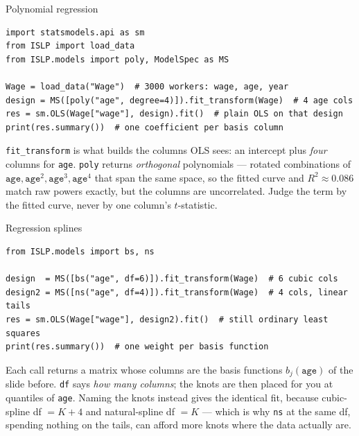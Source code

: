 \documentclass[aspectratio=169,11pt]{beamer}
\begin{document}

\begin{frame}[fragile]{Polynomial regression}
  \begin{lstlisting}
import statsmodels.api as sm
from ISLP import load_data
from ISLP.models import poly, ModelSpec as MS

Wage = load_data("Wage")  # 3000 workers: wage, age, year
design = MS([poly("age", degree=4)]).fit_transform(Wage)  # 4 age cols
res = sm.OLS(Wage["wage"], design).fit()  # plain OLS on that design
print(res.summary())  # one coefficient per basis column
  \end{lstlisting}
  \begin{readme}
    \texttt{fit\_transform} is what builds the columns OLS sees: an
    intercept plus \emph{four} columns for \texttt{age}. \texttt{poly}
    returns \emph{orthogonal} polynomials --- rotated combinations of
    $\texttt{age},\texttt{age}^2,\texttt{age}^3,\texttt{age}^4$ that span
    the same space, so the fitted curve and $R^2\approx0.086$ match raw
    powers exactly, but the columns are uncorrelated. Judge the term by
    the fitted curve, never by one column's $t$-statistic.
  \end{readme}
\end{frame}

\begin{frame}[fragile]{Regression splines}
  \begin{lstlisting}
from ISLP.models import bs, ns

design  = MS([bs("age", df=6)]).fit_transform(Wage)  # 6 cubic cols
design2 = MS([ns("age", df=4)]).fit_transform(Wage)  # 4 cols, linear tails
res = sm.OLS(Wage["wage"], design2).fit()  # still ordinary least squares
print(res.summary())  # one weight per basis function
  \end{lstlisting}
  \begin{readme}
    Each call returns a matrix whose columns are the basis functions
    $b_j(\texttt{age})$ of the slide before. \texttt{df} says \emph{how
    many columns}; the knots are then placed for you at quantiles of
    \texttt{age}. Naming the knots instead gives the identical fit,
    because cubic-spline df $=K+4$ and natural-spline df $=K$ --- which
    is why \texttt{ns} at the same df, spending nothing on the tails,
    can afford more knots where the data actually are.
  \end{readme}
\end{frame}
\end{document}
